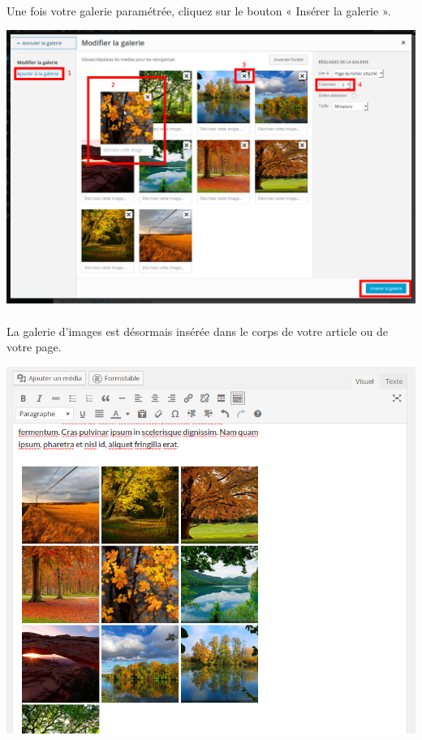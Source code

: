 \documentclass[10pt,a4paper]{article}
\begin{document}
\paragraph{}Une fois votre galerie paramétrée, cliquez sur le bouton « Insérer la galerie ».
\begin{center}
\includegraphics[scale=0.25]{img/0116.png}
\end{center}
\paragraph{}La galerie d'images est désormais insérée dans le corps de votre article ou de votre page.
\begin{center}
\includegraphics[scale=0.3]{img/0117.png}
\end{center}
\newpage
\end{document}
